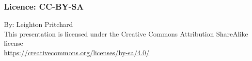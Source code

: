 
%
\begin{frame}
  \frametitle{Licence: CC-BY-SA}
  By: Leighton Pritchard \\
  This presentation is licensed under the Creative Commons Attribution ShareAlike license \\
  \href{https://creativecommons.org/licenses/by-sa/4.0/}{https://creativecommons.org/licenses/by-sa/4.0/}
\end{frame}
